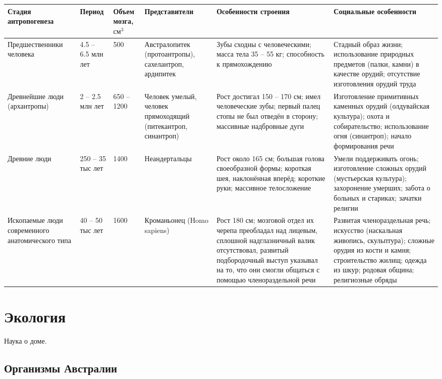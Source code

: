 \documentclass[12pt]{article}
\begin{document}
	\begin{xltabular}{\textwidth}{|X|p{1.6cm}|p{1.5cm}|X|X|X|}
		\hline
		\textbf{Стадия антропогенеза} & \textbf{Период} & \textbf{Объем мозга, $\text{см}^3$} & \textbf{Представители} & \textbf{Особенности строения} & \textbf{Социальные особенности}\\
		\hline
		Предшественники человека & 4.5 -- 6.5 млн лет & 500 & Австралопитек (протоантропы), сахелантроп, ардипитек & Зубы сходны с человеческими; масса тела 35 -- 55 кг; способность к прямохождению & Стадный образ жизни; использование природных предметов (палки, камни) в качестве орудий; отсутствие изготовления орудий труда \\
		\hline
		Древнейшие люди (архантропы) & 2 -- 2.5 млн лет & 650 -- 1200 & Человек умелый, человек прямоходящий (питекантроп, синантроп) & Рост достигал 150 -- 170 см; имел человеческие зубы; первый палец стопы не был отведён в сторону; массивные надбровные дуги & Изготовление примитивных каменных орудий (олдувайская культура); охота и собирательство; использование огня (синантроп); начало формирования речи \\
		\hline
		Древние люди & 250 -- 35 тыс лет & 1400 & Неандертальцы & Рост около 165 см; большая голова своеобразной формы; короткая шея, наклонённая вперёд; короткие руки; массивное телосложение & Умели поддерживать огонь; изготовление сложных орудий (мустьерская культура); захоронение умерших; забота о больных и стариках; зачатки религии \\
		\hline
		Ископаемые люди современного анатомического типа & 40 -- 50 тыс лет & 1600 & Кроманьонец (Homo sapiens) & Рост 180 см; мозговой отдел их черепа преобладал над лицевым, сплошной надглазничный валик отсутствовал, развитый подбородочный выступ указывал на то, что они смогли общаться с помощью членораздельной речи & Развитая членораздельная речь; искусство (наскальная живопись, скульптура); сложные орудия из кости и камня; строительство жилищ; одежда из шкур; родовая община; религиозные обряды \\
		\hline
	\end{xltabular}
	
	\section{Экология}
	
	Наука о доме.
	\newpage
	\subsection{Организмы Австралии}
	
\end{document}
